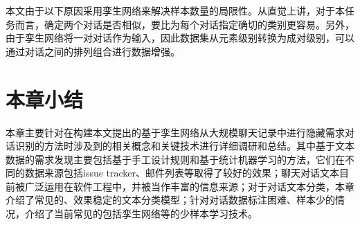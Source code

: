 本文由于以下原因采用孪生网络来解决样本数量的局限性。从直觉上讲，对于本任务而言，确定两个对话是否相似，要比为每个对话指定确切的类别更容易。另外，由于孪生网络将一对对话作为输入，因此数据集从元素级别转换为成对级别，可以通过对话之间的排列组合进行数据增强。

\section{本章小结}

本章主要针对在构建本文提出的基于孪生网络从大规模聊天记录中进行隐藏需求对话识别的方法时涉及到的相关概念和关键技术进行详细调研和总结。其中基于文本数据的需求发现主要包括基于手工设计规则和基于统计机器学习的方法，它们在不同的数据来源包括issue tracker、邮件列表等取得了较好的效果；聊天对话文本目前被广泛运用在软件工程中，并被当作丰富的信息来源；对于对话文本分类，本章介绍了常见的、效果稳定的文本分类模型；针对对话数据标注困难、样本少的情况，介绍了当前常见的包括孪生网络等的少样本学习技术。

